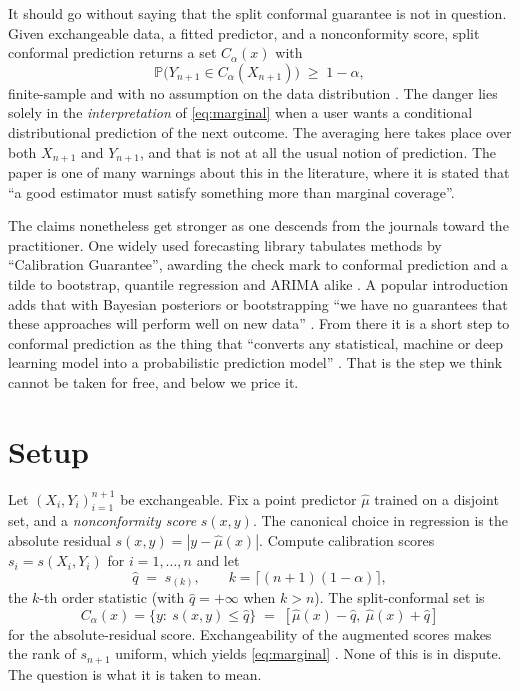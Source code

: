 \documentclass[11pt]{article}
\theoremstyle{definition}
\renewcommand{\Pr}{\mathbb{P}}
\begin{document}
It should go without saying that the split conformal guarantee is not in question. Given
exchangeable data, a fitted predictor, and a nonconformity score, split conformal prediction
returns a set $C_\alpha(x)$ with
\begin{equation}\label{eq:marginal}
  \Pr\!\big(Y_{n+1}\in C_\alpha(X_{n+1})\big)\;\ge\;1-\alpha,
\end{equation}
finite-sample and with no assumption on the data distribution
\citep{vovk2005algorithmic,lei2018distribution,angelopoulos2023gentle}. The danger lies
solely in the {\em interpretation} of \eqref{eq:marginal} when a user wants a conditional
distributional prediction of the next outcome. The averaging here takes place over both
$X_{n+1}$ and $Y_{n+1}$, and that is not at all the usual notion of prediction. The paper
\citet{lei2014distribution} is one of many warnings about this in the literature, where it
is stated that ``a good estimator must satisfy something more than marginal coverage''.

The claims nonetheless get stronger as one descends from the journals toward the
practitioner. One widely used forecasting library tabulates methods by ``Calibration
Guarantee'', awarding the check mark to conformal prediction and a tilde to bootstrap,
quantile regression and ARIMA alike \citep{nixtla_conformal}. A popular introduction adds
that with Bayesian posteriors or bootstrapping ``we have no guarantees that these approaches
will perform well on new data'' \citep{molnar_conformal}. From there it is a short step to
conformal prediction as the thing that ``converts any statistical, machine or deep learning
model into a probabilistic prediction model'' \citep{manokhin_neuralprophet}. That is the
step we think cannot be taken for free, and below we price it.

\section{Setup}

Let $(X_i,Y_i)_{i=1}^{n+1}$ be exchangeable. Fix a point predictor $\hat\mu$ trained on a
disjoint set, and a \emph{nonconformity score} $s(x,y)$. The canonical choice in regression
is the absolute residual $s(x,y)=|y-\hat\mu(x)|$. Compute calibration scores
$s_i=s(X_i,Y_i)$ for $i=1,\dots,n$ and let
\begin{equation}\label{eq:q}
  \hat q \;=\; s_{(k)}, \qquad k=\big\lceil (n+1)(1-\alpha)\big\rceil,
\end{equation}
the $k$-th order statistic (with $\hat q=+\infty$ when $k>n$). The split-conformal set is
\begin{equation}\label{eq:set}
  C_\alpha(x)=\{y:\ s(x,y)\le \hat q\}
  \;=\;[\hat\mu(x)-\hat q,\ \hat\mu(x)+\hat q]
\end{equation}
for the absolute-residual score. Exchangeability of the augmented scores makes the rank of
$s_{n+1}$ uniform, which yields \eqref{eq:marginal}
\citep{vovk2005algorithmic,lei2018distribution}. None of this is in dispute. The question is
what it is taken to mean.
\end{document}
